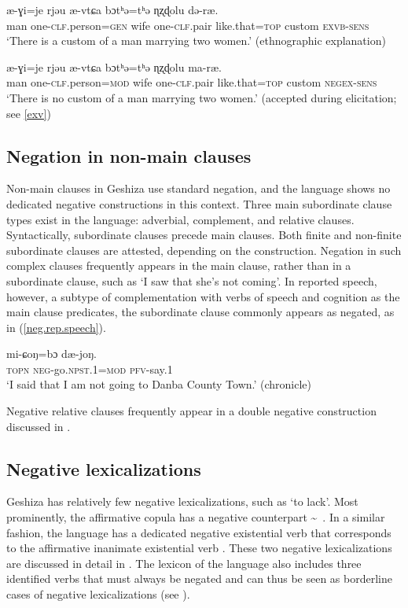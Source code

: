 \documentclass[output=paper,colorlinks,citecolor=brown]{langscibook}
\begin{document}
\ea
\label{exv}
 {æ-ɣi=je} {rjəu} {æ-vtɕa} {bɔtʰə=tʰə} {ɳʐɖolu} {də-ræ}.\\ 
      man  one-\textsc{clf}.person=\textsc{gen}    wife  one-\textsc{clf}.pair like.that=\textsc{top}  custom \textsc{exvb-sens}\\ 
\glt `There is a custom of a man marrying two women.' (ethnographic explanation)
\z

\ea
\label{negex}
 {æ-ɣi=je} {rjəu} {æ-vtɕa} {bɔtʰə=tʰə} {ɳʐɖolu} {ma-ræ}.\\ 
      man  one-\textsc{clf}.person=\textsc{mod}    wife  one-\textsc{clf}.pair like.that=\textsc{top}  custom \textsc{negex-sens}\\ 
\glt `There is no custom of a man marrying two women.' (accepted during elicitation; see \ref{exv})
\z


\subsection{Negation in non-main clauses}
Non-main clauses in Geshiza use standard negation, and the language shows no dedicated negative constructions in this context. Three main subordinate clause types exist in the language: adverbial, complement, and relative clauses. Syntactically, subordinate clauses precede main clauses. Both finite and non-finite subordinate clauses are attested, depending on the construction. Negation in such complex clauses frequently appears in the main clause, rather than in a subordinate clause, such as `I saw that she's not coming'. In reported speech, however, a subtype of complementation with verbs of speech and cognition as the main clause predicates, the subordinate clause commonly appears as negated, as in (\ref{neg.rep.speech}). 

\ea
\label{neg.rep.speech}
 {mi-ɕoŋ=bɔ} {dæ-joŋ}.\\ 
      \textsc{topn} \textsc{neg}-go.\textsc{npst.1}=\textsc{mod} \textsc{pfv}-say.1\\ 
\glt `I said that I am not going to Danba County Town.' (chronicle)
\z

Negative relative clauses frequently  appear in a double negative construction discussed in .

\subsection{Negative lexicalizations}
\label{neglex}
Geshiza has relatively few negative lexicalizations, such as  `to lack'. Most prominently, the affirmative copula  has a negative counterpart  \textasciitilde \ . In a similar fashion, the language has a dedicated negative existential verb  that corresponds to the affirmative inanimate existential verb . These two negative lexicalizations are discussed in detail in . The lexicon of the language also includes three identified verbs that must always be negated and can thus be seen as borderline cases of negative lexicalizations (see ).
\end{document}
